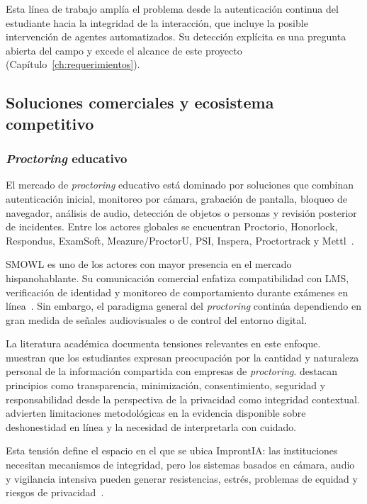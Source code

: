 Esta línea de trabajo amplía el problema desde la autenticación continua del estudiante hacia la integridad de la interacción, que incluye la posible intervención de agentes automatizados. Su detección explícita es una pregunta abierta del campo y excede el alcance de este proyecto (Capítulo~\ref{ch:requerimientos}).

\subsection{Soluciones comerciales y ecosistema competitivo}
\subsubsection{\textit{Proctoring} educativo}
El mercado de \textit{proctoring} educativo está dominado por soluciones que combinan autenticación inicial, monitoreo por cámara, grabación de pantalla, bloqueo de navegador, análisis de audio, detección de objetos o personas y revisión posterior de incidentes. Entre los actores globales se encuentran Proctorio, Honorlock, Respondus, ExamSoft, Meazure/ProctorU, PSI, Inspera, Proctortrack y Mettl~\parencite{Heinrich2025, Balash2021}.

SMOWL es uno de los actores con mayor presencia en el mercado hispanohablante. Su comunicación comercial enfatiza compatibilidad con LMS, verificación de identidad y monitoreo de comportamiento durante exámenes en línea~\parencite{SMOWL}. Sin embargo, el paradigma general del \textit{proctoring} continúa dependiendo en gran medida de señales audiovisuales o de control del entorno digital.

La literatura académica documenta tensiones relevantes en este enfoque. \textcite{Balash2021} muestran que los estudiantes expresan preocupación por la cantidad y naturaleza personal de la información compartida con empresas de \textit{proctoring}. \textcite{Mutimukwe2023} destacan principios como transparencia, minimización, consentimiento, seguridad y responsabilidad desde la perspectiva de la privacidad como integridad contextual. \textcite{Newton2024} advierten limitaciones metodológicas en la evidencia disponible sobre deshonestidad en línea y la necesidad de interpretarla con cuidado.

Esta tensión define el espacio en el que se ubica ImprontIA: las instituciones necesitan mecanismos de integridad, pero los sistemas basados en cámara, audio y vigilancia intensiva pueden generar resistencias, estrés, problemas de equidad y riesgos de privacidad~\parencite{Balash2021, Coghlan2021}.

